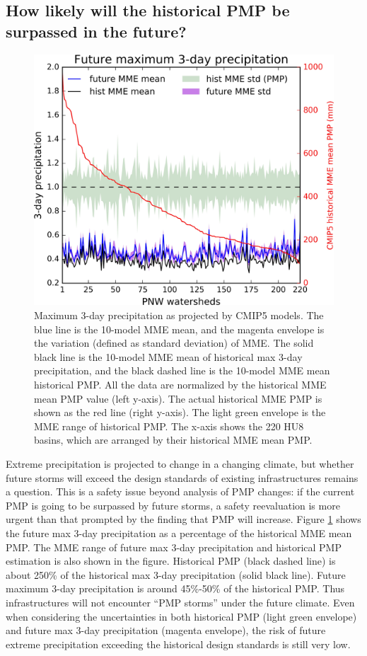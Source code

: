 \subsection{How likely will the historical PMP be surpassed in the future?}

\begin{figure}[htbp]
	\includegraphics[width=\linewidth]{pics/ch5/fig16.jpg}
	\caption{Maximum 3-day precipitation as projected by CMIP5 models. The blue line is the 10-model MME mean, and the magenta envelope is the variation (defined as standard deviation) of MME. The solid black line is the 10-model MME mean of historical max 3-day precipitation, and the black dashed line is the 10-model MME mean historical PMP. All the data are normalized by the historical MME mean PMP value (left y-axis). The actual historical MME PMP is shown as the red line (right y-axis). The light green envelope is the MME range of historical PMP. The x-axis shows the 220 HU8 basins, which are arranged by their historical MME mean PMP.}
	\label{fig:5-16}
\end{figure}

Extreme precipitation is projected to change in a changing climate, but whether future storms will exceed the design standards of existing infrastructures remains a question. This is a safety issue beyond analysis of PMP changes: if the current PMP is going to be surpassed by future storms, a safety reevaluation is more urgent than that prompted by the finding that PMP will increase. Figure \ref{fig:5-16} shows the future max 3-day precipitation as a percentage of the historical MME mean PMP. The MME range of future max 3-day precipitation and historical PMP estimation is also shown in the figure. Historical PMP (black dashed line) is about 250\% of the historical max 3-day precipitation (solid black line). Future maximum 3-day precipitation is around 45\%-50\% of the historical PMP. Thus infrastructures will not encounter “PMP storms” under the future climate. Even when considering the uncertainties in both historical PMP (light green envelope) and future max 3-day precipitation (magenta envelope), the risk of future extreme precipitation exceeding the historical design standards is still very low.

